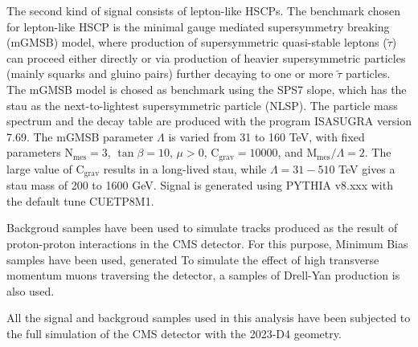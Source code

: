 \documentclass[11pt,twoside,a4paper]{article}
\begin{document}
The second kind of signal consists of lepton-like HSCPs. 
The benchmark chosen for lepton-like HSCP is the minimal gauge mediated supersymmetry breaking (mGMSB) model, where production of supersymmetric quasi-stable leptons ($\tilde{\tau}$) can proceed either directly or via production of heavier supersymmetric particles (mainly squarks and gluino
pairs) further decaying to one or more $\tilde{\tau}$ particles. 
The mGMSB model is chosed as benchmark using the SPS7 slope, which has the stau as the next-to-lightest supersymmetric particle (NLSP). 
The particle mass spectrum and the decay table are produced with the program ISASUGRA version 7.69. The mGMSB parameter $\Lambda$ is varied from 31 to
160 TeV, with fixed parameters $\mathrm{N}_{\mathrm{mes}} = 3$, $\tan \beta = 10$, $\mu > 0$, $\mathrm{C}_{\mathrm{grav}} = 10000$, and $\mathrm{M}_{\mathrm{mes}}/\Lambda = 2$. 
The large value of $\mathrm{C}_{\mathrm{grav}}$ results in a long-lived stau, while $\Lambda = 31-510$ TeV gives a stau mass of 200 to
1600 GeV. 
Signal is generated using PYTHIA v8.xxx with the default tune CUETP8M1.

Backgroud samples have been used to simulate tracks produced as the result of proton-proton interactions in the CMS detector.
For this purpose, Minimum Bias samples have been used, generated 
To simulate the effect of high transverse momentum muons traversing the detector, a samples of Drell-Yan production is also used.


All the signal and backgroud samples used in this analysis have been subjected to the full simulation of the CMS detector with the 2023-D4 geometry. 
\end{document}

